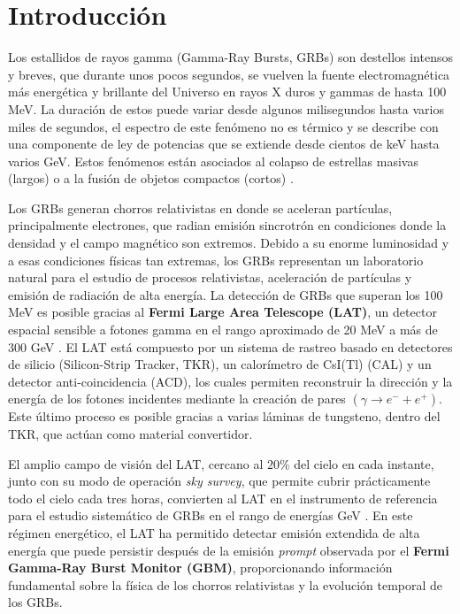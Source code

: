 \section{Introducción}

Los estallidos de rayos gamma (Gamma-Ray Bursts, GRBs) son destellos intensos y breves, que durante unos pocos segundos, se vuelven la fuente electromagnética más energética y brillante del Universo \cite{Piran2000} en rayos X duros y gammas de hasta 100 MeV. La duración de estos puede variar desde algunos milisegundos hasta varios miles de segundos, el espectro de este fenómeno no es térmico y se describe con una componente de ley de potencias que se extiende desde cientos de keV hasta varios GeV. Estos fenómenos están asociados al colapso de estrellas masivas (largos) o a la fusión de objetos compactos (cortos) \cite{Rosswog2009}. 

\vspace{0.5cm}

 Los GRBs generan chorros relativistas en donde se aceleran partículas, principalmente electrones, que radian emisión sincrotrón en condiciones donde la densidad y el campo magnético son extremos. Debido a su enorme luminosidad y a esas condiciones físicas tan extremas, los GRBs representan un laboratorio natural para el estudio de procesos relativistas, aceleración de partículas y emisión de radiación de alta energía. La detección de GRBs que superan los 100 MeV es posible gracias al \textbf{Fermi Large Area Telescope (LAT)}, un detector espacial sensible a fotones gamma en el rango aproximado de 20 MeV a más de 300 GeV \cite{Atwood2009}. El LAT está compuesto por un sistema de rastreo basado en detectores de silicio (Silicon-Strip Tracker, TKR), un calorímetro de CsI(Tl) (CAL) y un detector anti-coincidencia (ACD), los cuales permiten reconstruir la dirección y la energía de los fotones incidentes mediante la creación de pares $(\gamma\rightarrow e^{-}+e^{+})$. Este último proceso es posible gracias a varias láminas de tungsteno, dentro del TKR, que actúan como material convertidor.

\vspace{0.5cm}

El amplio campo de visión del LAT, cercano al $20\%$ del cielo en cada instante, junto con su modo de operación \textit{sky survey}, que permite cubrir prácticamente todo el cielo cada tres horas, convierten al LAT en el instrumento de referencia para el estudio sistemático de GRBs en el rango de energías GeV \cite{Atwood2009}. En este régimen energético, el LAT ha permitido detectar emisión extendida de alta energía que puede persistir después de la emisión \textit{prompt} observada por el \textbf{Fermi Gamma-Ray Burst Monitor (GBM)}, proporcionando información fundamental sobre la física de los chorros relativistas y la evolución temporal de los GRBs.

